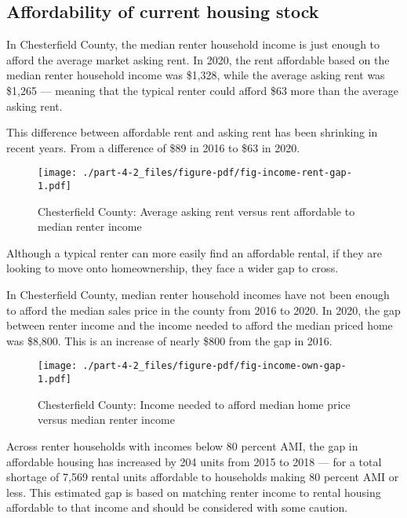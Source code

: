 \documentclass[
  letterpaper,
  DIV=11,
  numbers=noendperiod]{scrreprt}
\begin{document}
\hypertarget{affordability-of-current-housing-stock-1}{%
\subsection{Affordability of current housing
stock}\label{affordability-of-current-housing-stock-1}}

In Chesterfield County, the median renter household income is just
enough to afford the average market asking rent. In 2020, the rent
affordable based on the median renter household income was \$1,328,
while the average asking rent was \$1,265 --- meaning that the typical
renter could afford \$63 more than the average asking rent.

This difference between affordable rent and asking rent has been
shrinking in recent years. From a difference of \$89 in 2016 to \$63 in
2020.

\begin{figure}

{\centering \texttt{[image: ./part-4-2\_files/figure-pdf/fig-income-rent-gap-1.pdf]}

}

\caption{\label{fig-income-rent-gap}Chesterfield County: Average asking
rent versus rent affordable to median renter income}

\end{figure}

Although a typical renter can more easily find an affordable rental, if
they are looking to move onto homeownership, they face a wider gap to
cross.

In Chesterfield County, median renter household incomes have not been
enough to afford the median sales price in the county from 2016 to 2020.
In 2020, the gap between renter income and the income needed to afford
the median priced home was \$8,800. This is an increase of nearly \$800
from the gap in 2016.

\begin{figure}

{\centering \texttt{[image: ./part-4-2\_files/figure-pdf/fig-income-own-gap-1.pdf]}

}

\caption{\label{fig-income-own-gap}Chesterfield County: Income needed to
afford median home price versus median renter income}

\end{figure}

Across renter households with incomes below 80 percent AMI, the gap in
affordable housing has increased by 204 units from 2015 to 2018 --- for
a total shortage of 7,569 rental units affordable to households making
80 percent AMI or less. This estimated gap is based on matching renter
income to rental housing affordable to that income and should be
considered with some caution.
\end{document}
